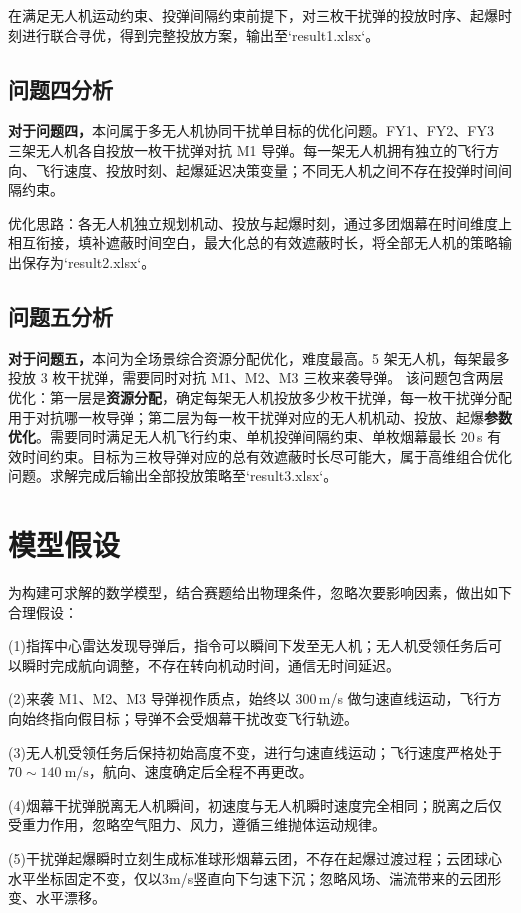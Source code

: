 \documentclass[12pt,a4paper]{article}
\begin{document}
	在满足无人机运动约束、投弹间隔约束前提下，对三枚干扰弹的投放时序、起爆时刻进行联合寻优，得到完整投放方案，输出至`result1.xlsx`。
	
	\subsection{问题四分析}
	\textbf{对于问题四，}本问属于多无人机协同干扰单目标的优化问题。FY1、FY2、FY3 三架无人机各自投放一枚干扰弹对抗 M1 导弹。每一架无人机拥有独立的飞行方向、飞行速度、投放时刻、起爆延迟决策变量；不同无人机之间不存在投弹时间间隔约束。
	
	优化思路：各无人机独立规划机动、投放与起爆时刻，通过多团烟幕在时间维度上相互衔接，填补遮蔽时间空白，最大化总的有效遮蔽时长，将全部无人机的策略输出保存为`result2.xlsx`。
	\subsection{问题五分析}
	\textbf{对于问题五，}本问为全场景综合资源分配优化，难度最高。5 架无人机，每架最多投放 3 枚干扰弹，需要同时对抗 M1、M2、M3 三枚来袭导弹。
	该问题包含两层优化：第一层是\textbf{资源分配}，确定每架无人机投放多少枚干扰弹，每一枚干扰弹分配用于对抗哪一枚导弹；第二层为每一枚干扰弹对应的无人机机动、投放、起爆\textbf{参数优化}。需要同时满足无人机飞行约束、单机投弹间隔约束、单枚烟幕最长 20 s 有效时间约束。目标为三枚导弹对应的总有效遮蔽时长尽可能大，属于高维组合优化问题。求解完成后输出全部投放策略至`result3.xlsx`。
	
	\section{模型假设}
	为构建可求解的数学模型，结合赛题给出物理条件，忽略次要影响因素，做出如下合理假设：
	
	(1)指挥中心雷达发现导弹后，指令可以瞬间下发至无人机；无人机受领任务后可以瞬时完成航向调整，不存在转向机动时间，通信无时间延迟。
	
	(2)来袭 M1、M2、M3 导弹视作质点，始终以 300 m/s 做匀速直线运动，飞行方向始终指向假目标；导弹不会受烟幕干扰改变飞行轨迹。
	
	(3)无人机受领任务后保持初始高度不变，进行匀速直线运动；飞行速度严格处于\(70\sim140\ \text{m/s}\)，航向、速度确定后全程不再更改。
	
	(4)烟幕干扰弹脱离无人机瞬间，初速度与无人机瞬时速度完全相同；脱离之后仅受重力作用，忽略空气阻力、风力，遵循三维抛体运动规律。
	
	(5)干扰弹起爆瞬时立刻生成标准球形烟幕云团\cite{wu2016}，不存在起爆过渡过程；云团球心水平坐标固定不变，仅以3m/s竖直向下匀速下沉；忽略风场、湍流带来的云团形变、水平漂移。
	
\end{document}
